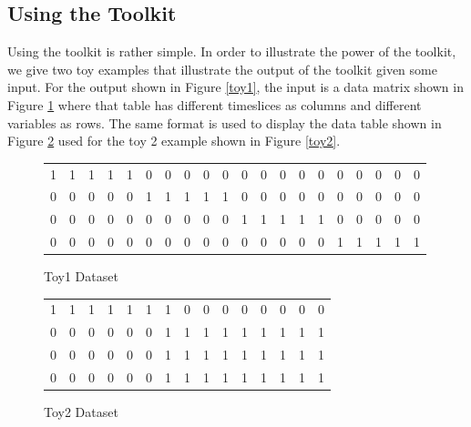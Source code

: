 \documentclass{article}
\begin{document}
\subsection*{Using the Toolkit}

Using the toolkit is rather simple. In order to illustrate the power of the 
toolkit, we give two toy examples that illustrate the output of the toolkit 
given some input. For the output shown in Figure \ref{toy1}, the input is 
a data matrix shown in Figure \ref{tab:toy1} where that table has different 
timeslices as columns and different variables as rows. The same format is used
to display the data table shown in Figure \ref{tab:toy2} used for the toy 2 
example shown in Figure \ref{toy2}. 

\begin{figure}[h]
  \centering
  \begin{tabular}{c |  c | c| c|  c |c| c| c| c| c| c| c| c|c|c|c|c|c|c|c}
    \hline
    1 & 1 & 1 & 1 & 1 & 0 & 0 & 0 & 0 & 0 & 0 & 0 & 0 & 0 & 0 & 0 &0&0&0& 0 \\
    0 & 0 & 0 & 0 & 0 & 1 & 1 & 1 & 1 & 1 & 0 & 0 & 0 & 0 & 0 & 0 &0&0&0& 0 \\
    0 & 0 & 0 & 0 & 0 & 0 & 0 & 0 & 0 & 0 & 1 & 1 & 1 & 1 & 1 & 0 &0&0&0& 0 \\
    0 & 0 & 0& 0 & 0 & 0 & 0 & 0 & 0 & 0 & 0 & 0 & 0 & 0 & 0 & 1 &1&1&1& 1 \\
    \hline
  \end{tabular}
    \caption{Toy1 Dataset}
    \label{tab:toy1}

\end{figure}

\begin{figure}[h]
  \centering
  \begin{tabular}{c| c| c| c| c| c| c| c|c|c|c|c|c|c|c}
    \hline
    1 & 1 & 1 & 1 & 1 & 1 & 1 & 0 & 0 & 0 & 0 & 0 & 0 & 0 & 0 \\
    0 & 0 & 0 & 0 & 0 & 0 & 1 & 1 & 1 & 1 & 1 & 1 & 1 & 1 & 1 \\ 
    0 & 0 & 0 & 0 & 0 & 0 & 1 & 1 & 1 & 1 & 1 & 1 & 1 & 1 & 1 \\ 
    0 & 0 & 0 & 0 & 0 & 0 & 1 & 1 & 1 & 1 & 1 & 1 & 1 & 1 & 1 \\ 
    \hline
  \end{tabular}
    \caption{Toy2 Dataset}
    \label{tab:toy2}

\end{figure}
\end{document}
